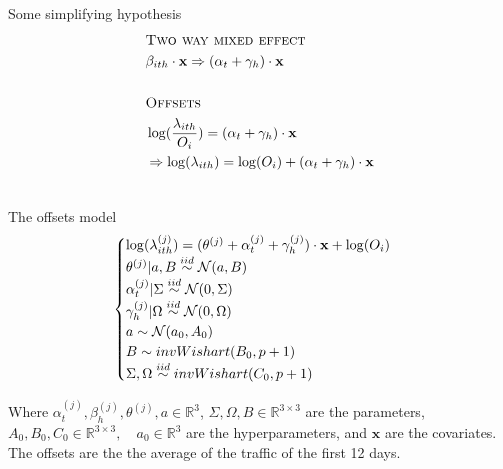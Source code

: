 \documentclass{beamer}
\begin{document}
\begin{frame}{Some simplifying hypothesis}
\begin{equation*}
\begin{aligned}
&\textsc{Two way mixed effect}\\
&\beta_{ith}\cdot\mathbf{x} \Rightarrow (\alpha_{t} + \gamma_{h})\cdot\mathbf{x}\\
&\\
&\textsc{Offsets}\\
&\log(\frac{\lambda_{ith}}{O_i}) = (\alpha_{t} + \gamma_{h})\cdot\mathbf{x} \\&\Rightarrow \log(\lambda_{ith}) = \log(O_i) + (\alpha_{t} + \gamma_{h})\cdot\mathbf{x}\\
&\\
\end{aligned}
\end{equation*}
\end{frame}

\begin{frame}{The offsets model}
\begin{equation}
\begin{cases}
\log(\lambda^{(j)}_{ith}) = (\boldmath{\theta^{(j)} +  \alpha^{(j)}_{t} + \gamma_{h}^{(j)})}\cdot\mathbf{x} + \log(O_i)\\
\theta^{(j)}|a,B \stackrel{iid}{\sim} \mathcal{N}(a,B)\\
\alpha_{t}^{(j)}|\Sigma \stackrel{iid}{\sim} \mathcal{N}(0, \Sigma)\\
\gamma_{h}^{(j)}|\Omega \stackrel{iid}{\sim} \mathcal{N}(0, \Omega)\\
a \sim \mathcal{N}(a_0, A_0)\\
B \sim invWishart(B_0, p+1)\\
\Sigma, \Omega \stackrel{iid}{\sim} invWishart(C_0, p+1)

\end{cases}
\end{equation}

Where $\alpha_{t}^{(j)}, \beta_{h}^{(j)}, \theta^{(j)}, a \in \mathbb{R}^3$, $\Sigma, \Omega, B \in \mathbb{R}^{3\times 3}$ are the parameters, $A_0, B_0, C_0 \in \mathbb{R}^{3\times 3},\quad a_0 \in \mathbb{R}^3$ are the hyperparameters, and $\mathbf{x}$ are the covariates.\\

The offsets are the the average of the traffic of the first 12 days.
\end{frame}
\end{document}
